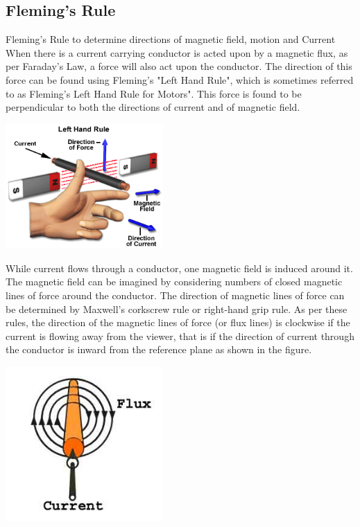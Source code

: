 \documentclass[11pt,a4paper]{article}
\begin{document}
\subsection{Fleming's Rule}
Fleming's Rule to determine directions of magnetic field, motion and Current
When there is a current carrying conductor is acted upon by a magnetic flux, as per Faraday's Law, a force will also act upon the conductor. The direction of this force can be found using Fleming's "Left Hand Rule", which is sometimes referred to as Fleming's Left Hand Rule for Motors". This force is found to be perpendicular to both the directions of current and of magnetic field.
\begin{center}
\includegraphics[width=6cm]{flem2.png}
\end{center}
While current flows through a conductor, one magnetic field is induced around it. The magnetic field can be imagined by considering numbers of closed magnetic lines of force around the conductor. The direction of magnetic lines of force can be determined by Maxwell’s corkscrew rule or right-hand grip rule. As per these rules, the direction of the magnetic lines of force (or flux lines) is clockwise if the current is flowing away from the viewer, that is if the direction of current through the conductor is inward from the reference plane as shown in the figure.\cite{e8}
\begin{center}
\includegraphics[width=6cm]{flem.jpg}
\end{center}
\end{document}
